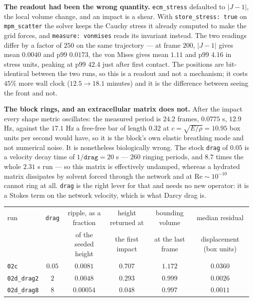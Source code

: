 \documentclass[10pt,a4paper]{article}
\newcommand{\op}[1]{\texttt{#1}}
\newcommand{\code}[1]{\texttt{#1}}
\begin{document}
\textbf{The readout had been the wrong quantity.} \op{ecm\_stress} defaulted to $|J-1|$, the local
volume change, and an impact is a shear. With \code{store\_stress: true} on \op{mpm\_scatter} the solver
keeps the Cauchy stress it already computed to make the grid forces, and \code{measure: vonmises} reads
its invariant instead. The two readings differ by a factor of $250$ on the same trajectory --- at frame
$200$, $|J-1|$ gives mean $0.0040$ and p99 $0.0173$, the von Mises gives mean $1.11$ and p99 $4.16$ in
stress units, peaking at p99 $42.4$ just after first contact. The positions are bit-identical between
the two runs, so this is a readout and not a mechanism; it costs $45\%$ more wall clock ($12.5\to18.1$
minutes) and it is the difference between seeing the front and not.

\textbf{The block rings, and an extracellular matrix does not.} After the impact every shape metric
oscillates: the measured period is $24.2$ frames, $0.0775$ s, $12.9$ Hz, against the $17.1$ Hz a
free-free bar of length $0.32$ at $c=\sqrt{E/\rho}=10.95$ box units per second would have, so it is the
block's own elastic breathing mode and not numerical noise. It is nonetheless biologically wrong. The
stock \code{drag} of $0.05$ is a velocity decay time of $1/\code{drag}=20$ s --- $260$ ringing periods,
and $8.7$ times the whole $2.31$ s run --- so this matrix is effectively undamped, whereas a hydrated
matrix dissipates by solvent forced through the network and at $\mathrm{Re}\sim10^{-10}$ cannot ring at
all. \code{drag} is the right lever for that and needs no new operator: it is a Stokes term on the
network velocity, which is what Darcy drag is.

\smallskip
{\small\begin{tabular}{@{}lccccc@{}}\toprule
run & \code{drag} & ripple, as a fraction & height returned at & bounding volume & median residual\\
    &             & of the seeded height  & the first impact   & at the last frame & displacement (box units)\\\midrule
\op{02c}          & $0.05$ & $0.0081$  & $0.707$ & $1.172$ & $0.0360$\\
\op{02d\_drag2}   & $2$    & $0.0048$  & $0.293$ & $0.999$ & $0.0026$\\
\op{02d\_drag8}   & $8$    & $0.00054$ & $0.048$ & $0.997$ & $0.0011$\\
\bottomrule\end{tabular}}
\smallskip
\end{document}
